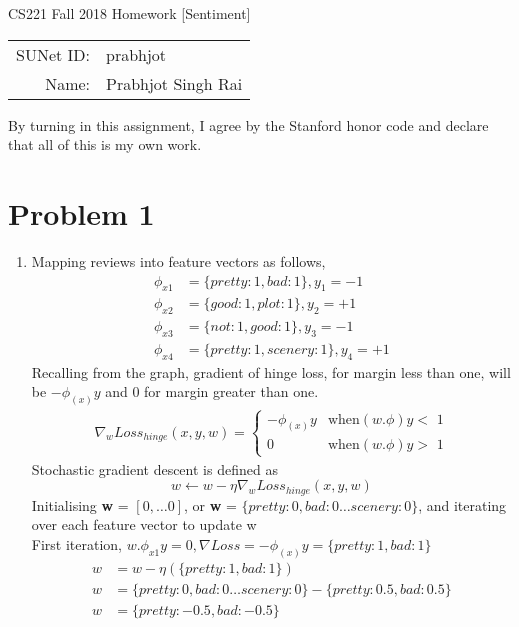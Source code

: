 \documentclass[12pt]{article}
\begin{document}
\begin{center}
{\Large CS221 Fall 2018 Homework [Sentiment]}

\begin{tabular}{rl}
SUNet ID: & prabhjot \\
Name: & Prabhjot Singh Rai
\end{tabular}
\end{center}

By turning in this assignment, I agree by the Stanford honor code and declare
that all of this is my own work.

\section*{Problem 1}

\begin{enumerate}[label=(\alph*)]
  \item Mapping reviews into feature vectors as follows,
\begin{align*}
\phi_{x1} & = \{ pretty: 1, bad: 1 \}, y_1 = -1 \\
\phi_{x2} & = \{ good: 1, plot: 1\}, y_2 = +1 \\
\phi_{x3} & = \{ not:1, good: 1\}, y_3 = -1 \\
\phi_{x4} & = \{ pretty: 1, scenery: 1 \}, y_4 = +1
\end{align*}
Recalling from the graph, gradient of hinge loss, for margin less than one, will be $-\phi_{(x)}y$ and $0$ for margin greater than one.
\begin{align*}
\nabla_w Loss_{hinge}(x, y, w) = \begin{cases}
-\phi_{(x)}y & \text{when$(w.\phi)y <$ 1} \\
0 & \text{when$(w.\phi)y >$ 1}
\end{cases}
\end{align*}
Stochastic gradient descent is defined as
$$ w \leftarrow w - \eta \nabla_w Loss_{hinge}(x, y, w) $$
Initialising \textbf{w} = $[0, \dots 0]$, or \textbf{w} = $\{ pretty: 0, bad: 0 \dots scenery: 0\}$, and iterating over each feature vector to update w \\
First iteration, $w.\phi_{x1}y = 0, \nabla Loss = -\phi_{(x)}y = \{ pretty: 1, bad: 1\}$
\begin{align*}
w &= w - \eta (\{pretty: 1, bad: 1\}) \\
w &= \{ pretty: 0, bad: 0 \dots scenery: 0\} - \{pretty: 0.5, bad: 0.5\} \\
w &= \{ pretty: -0.5, bad: -0.5 \}
\end{align*}

\end{enumerate}
\end{document}
